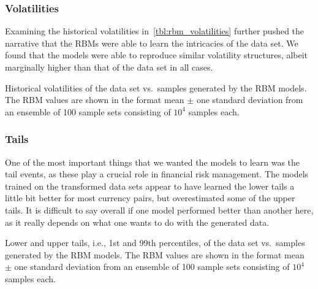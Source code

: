 \subsubsection{Volatilities}
Examining the historical volatilities in~\cref{tbl:rbm_volatilities} further pushed the narrative that the RBMs were able to learn the intricacies of the data set.
We found that the models were able to reproduce similar volatility structures, albeit marginally higher than that of the data set in all cases.
\begin{table}[!htb]
    \centering
    \begin{adjustbox}{max width=\textwidth}
        
    \end{adjustbox}
    \caption{Historical volatilities of the data set vs.~samples generated by the RBM models. The RBM values are shown in the format mean \(\pm\) one standard deviation from an ensemble of 100 sample sets consisting of \( 10^4 \) samples each.}
    \label{tbl:rbm_volatilities}
\end{table}

\subsubsection{Tails}
One of the most important things that we wanted the models to learn was the tail events, as these play a crucial role in financial risk management.
The models trained on the transformed data sets appear to have learned the lower tails a little bit better for most currency pairs, but overestimated some of the upper tails.
It is difficult to say overall if one model performed better than another here, as it really depends on what one wants to do with the generated data.
\begin{table}[!htb]
    \centering
    \begin{adjustbox}{max width=\textwidth}
        
    \end{adjustbox}
    \caption{Lower and upper tails, i.e., 1st and 99th percentiles, of the data set vs.~samples generated by the RBM models. The RBM values are shown in the format mean \(\pm\) one standard deviation from an ensemble of 100 sample sets consisting of \( 10^4 \) samples each.}
    \label{tbl:rbm_tails}
\end{table}

